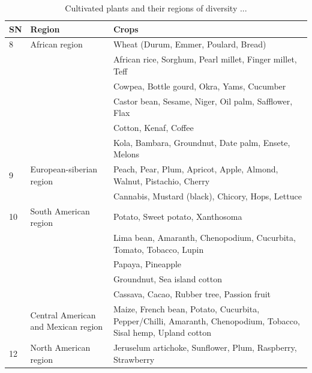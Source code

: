 \documentclass[11pt,ignorenonframetext,aspectratio=169]{beamer}
\begin{document}
\begin{frame}{}
\protect\hypertarget{section-10}{}
\begin{table}

\caption{\label{tab:cultivated-megacentres-tab3}Cultivated plants and their regions of diversity ...}
\centering
\fontsize{6}{8}\selectfont
\begin{tabular}[t]{>{\raggedleft\arraybackslash}p{4em}>{\raggedleft\arraybackslash}p{14em}>{\raggedleft\arraybackslash}p{28em}}
\toprule
SN & Region & Crops\\
\midrule
\rowcolor{gray!6}  8 & African region & Wheat (Durum, Emmer, Poulard, Bread)\\
 &  & African rice, Sorghum, Pearl millet, Finger millet, Teff\\
\rowcolor{gray!6}   &  & Cowpea, Bottle gourd, Okra, Yams, Cucumber\\
 &  & Castor bean, Sesame, Niger, Oil palm, Safflower, Flax\\
\rowcolor{gray!6}   &  & Cotton, Kenaf, Coffee\\
\addlinespace
 &  & Kola, Bambara, Groundnut, Date palm, Ensete, Melons\\
\rowcolor{gray!6}  9 & European-siberian region & Peach, Pear, Plum, Apricot, Apple, Almond, Walnut, Pistachio, Cherry\\
 &  & Cannabis, Mustard (black), Chicory, Hops, Lettuce\\
\rowcolor{gray!6}  10 & South American region & Potato, Sweet potato, Xanthosoma\\
 &  & Lima bean, Amaranth, Chenopodium, Cucurbita, Tomato, Tobacco, Lupin\\
\addlinespace
\rowcolor{gray!6}   &  & Papaya, Pineapple\\
 &  & Groundnut, Sea island cotton\\
\rowcolor{gray!6}   &  & Cassava, Cacao, Rubber tree, Passion fruit\\
11 & Central American and Mexican region & Maize, French bean, Potato, Cucurbita, Pepper/Chilli, Amaranth, Chenopodium, Tobacco, Sisal hemp, Upland cotton\\
\rowcolor{gray!6}  12 & North American region & Jeruselum artichoke, Sunflower, Plum, Raspberry, Strawberry\\
\bottomrule
\end{tabular}
\end{table}
\end{frame}
\end{document}
